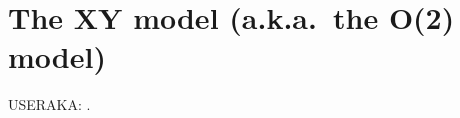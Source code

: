 \documentclass{article}
\newcommand\aka[1]{(a.k.a.\ #1)}
\begin{document}
\section{The XY model \aka{the O(2) model}}\label{xy}
USERAKA: .
\end{document}
